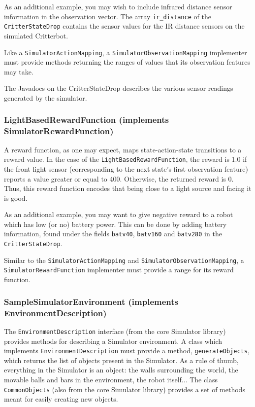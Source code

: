 \documentclass[12pt]{article}
\newcommand{\code}[1]{\texttt{#1}}
\begin{document}
As an additional example, you may wish to include infrared distance sensor
information in the observation vector. The array \verb+ir_distance+ of the
\code{CritterStateDrop} contains the sensor values for the IR distance
sensors on the simulated Critterbot.

Like a \code{SimulatorActionMapping}, a \code{SimulatorObservationMapping}
implementer must provide methods returning the ranges of values that its
observation features may take.

The Javadocs on the CritterStateDrop describes the various sensor readings
generated by the simulator.

\subsubsection[LightBasedRewardFunction]{LightBasedRewardFunction (implements SimulatorRewardFunction)}

A reward function, as one may expect, maps state-action-state transitions to
a reward value. In the case of the \code{LightBasedRewardFunction}, the 
reward is 1.0 if the front light sensor (corresponding to the next state's
first observation feature) reports a value greater or equal to 400. Otherwise,
the returned reward is 0. Thus, this reward function encodes that being close
to a light source and facing it is good.

As an additional example, you may want to give negative reward to a robot
which has low (or no) battery power. This can be done by adding battery 
information, found under the fields \verb+batv40+, \verb+batv160+ and
\verb+batv280+ in the \code{CritterStateDrop}.

Similar to the \code{SimulatorActionMapping} and 
\code{SimulatorObservationMapping}, a \code{SimulatorRewardFunction}
implementer must provide a range for its reward function.

\subsubsection[SampleSimulatorEnvironment]{SampleSimulatorEnvironment (implements EnvironmentDescription)} 

The \code{EnvironmentDescription} interface (from the core Simulator library)
provides methods for describing a Simulator environment. A class which 
implements \code{EnvironmentDescription} must provide a method,
\code{generateObjects}, which returns the list of objects present in the
Simulator. As a rule of thumb, everything in the Simulator is an object:
the walls surrounding the world, the movable balls and bars in the
environment, the robot itself... The class \code{CommonObjects} (also from
the core Simulator library) provides a set of methods meant for easily
creating new objects.
\end{document}
